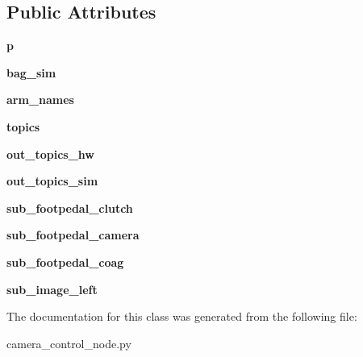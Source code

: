 \subsection*{Public Attributes}
\begin{DoxyCompactItemize}
\item 
\hypertarget{classcamera__control__node_1_1bag__writer_a1f6b4c64a1226eb1caeac81764568bea}{{\bfseries p}}\label{classcamera__control__node_1_1bag__writer_a1f6b4c64a1226eb1caeac81764568bea}

\item 
\hypertarget{classcamera__control__node_1_1bag__writer_af6364cd59969d248417d5ed1f7bf0e5f}{{\bfseries bag\-\_\-sim}}\label{classcamera__control__node_1_1bag__writer_af6364cd59969d248417d5ed1f7bf0e5f}

\item 
\hypertarget{classcamera__control__node_1_1bag__writer_af7808eb6e4e53acd6cf108b6b62a3e86}{{\bfseries arm\-\_\-names}}\label{classcamera__control__node_1_1bag__writer_af7808eb6e4e53acd6cf108b6b62a3e86}

\item 
\hypertarget{classcamera__control__node_1_1bag__writer_ab964e7087aeb8facd0536972fdeb524c}{{\bfseries topics}}\label{classcamera__control__node_1_1bag__writer_ab964e7087aeb8facd0536972fdeb524c}

\item 
\hypertarget{classcamera__control__node_1_1bag__writer_a6024ff1465c350d04d030b40419b6817}{{\bfseries out\-\_\-topics\-\_\-hw}}\label{classcamera__control__node_1_1bag__writer_a6024ff1465c350d04d030b40419b6817}

\item 
\hypertarget{classcamera__control__node_1_1bag__writer_ad8c417bbb935770819d307cd123e68a6}{{\bfseries out\-\_\-topics\-\_\-sim}}\label{classcamera__control__node_1_1bag__writer_ad8c417bbb935770819d307cd123e68a6}

\item 
\hypertarget{classcamera__control__node_1_1bag__writer_a84469e345a33bd2831553e039b33123d}{{\bfseries sub\-\_\-footpedal\-\_\-clutch}}\label{classcamera__control__node_1_1bag__writer_a84469e345a33bd2831553e039b33123d}

\item 
\hypertarget{classcamera__control__node_1_1bag__writer_aea1c819eb4c4bbcf2ce3be709f258919}{{\bfseries sub\-\_\-footpedal\-\_\-camera}}\label{classcamera__control__node_1_1bag__writer_aea1c819eb4c4bbcf2ce3be709f258919}

\item 
\hypertarget{classcamera__control__node_1_1bag__writer_a44c8ee868b7c8f92ce6dbaf7a26a240c}{{\bfseries sub\-\_\-footpedal\-\_\-coag}}\label{classcamera__control__node_1_1bag__writer_a44c8ee868b7c8f92ce6dbaf7a26a240c}

\item 
\hypertarget{classcamera__control__node_1_1bag__writer_afdaf2deb7ceeab9fce5b3f23ef1534e1}{{\bfseries sub\-\_\-image\-\_\-left}}\label{classcamera__control__node_1_1bag__writer_afdaf2deb7ceeab9fce5b3f23ef1534e1}

\end{DoxyCompactItemize}


The documentation for this class was generated from the following file\-:\begin{DoxyCompactItemize}
\item 
camera\-\_\-control\-\_\-node.\-py\end{DoxyCompactItemize}
